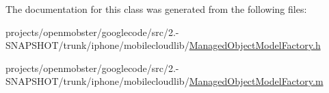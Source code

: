 \-The documentation for this class was generated from the following files\-:\begin{DoxyCompactItemize}
\item 
projects/openmobster/googlecode/src/2.-\/\-S\-N\-A\-P\-S\-H\-O\-T/trunk/iphone/mobilecloudlib/\hyperlink{_managed_object_model_factory_8h}{\-Managed\-Object\-Model\-Factory.\-h}\item 
projects/openmobster/googlecode/src/2.-\/\-S\-N\-A\-P\-S\-H\-O\-T/trunk/iphone/mobilecloudlib/\hyperlink{_managed_object_model_factory_8m}{\-Managed\-Object\-Model\-Factory.\-m}\end{DoxyCompactItemize}
